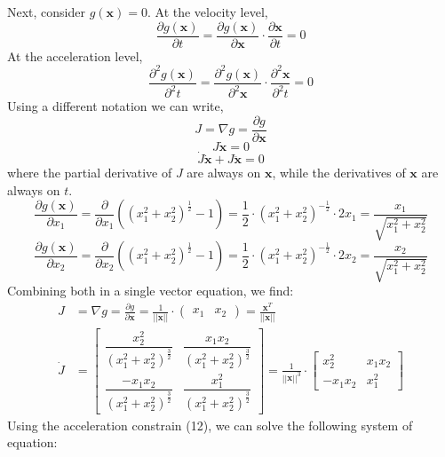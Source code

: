 \documentclass{article}
\begin{document}
Next, consider $g(\mathbf{x}) = 0$. At the velocity level,
\[
\frac{\partial{g(\mathbf{x})}}{\partial{t}}  = \frac{\partial{g(\mathbf{x})}}{\partial{\mathbf{x}}} \cdot \frac{\partial{\mathbf{x}}}{\partial{t}} = 0
\]
At the acceleration level,
\[
\frac{\partial^2{g(\mathbf{x})}}{\partial^2 t}  = \frac{\partial^2{g(\mathbf{x})}}{\partial^2{\mathbf{x}}} \cdot \frac{\partial^2{\mathbf{x}}}{\partial^2{t}} = 0
\]
Using a different notation we can write,
\begin{equation}
J = \nabla g = \frac{\partial{g}}{\partial{\mathbf{x}}}
\end{equation}
\begin{equation}
J \dot{\mathbf{x}} = 0
\end{equation}
\begin{equation}
\dot{J} \dot{\mathbf{x}} + J \ddot{\mathbf{x}} = 0
\end{equation}
where the partial derivative of $J$ are always on $\mathbf{x}$, while the derivatives of $\mathbf{x}$ are always on $t$.
\[    \frac{\partial g(\mathbf{x})}{\partial x_1} = \frac{\partial}{\partial x_1}((x_1^2+x_2^2)^{\frac{1}{2}} - 1)  = \frac{1}{2} \cdot (x_1^2 + x_2^2)^{-\frac{1}{2}} \cdot 2 x_1 = \frac{x_1}{\sqrt{x_1^2 + x_2^2}}
\]
\[
    \frac{\partial g(\mathbf{x})}{\partial x_2} = \frac{\partial}{\partial x_2}((x_1^2+x_2^2)^{\frac{1}{2}} - 1)  = \frac{1}{2} \cdot (x_1^2 + x_2^2)^{-\frac{1}{2}} \cdot 2 x_2 = \frac{x_2}{\sqrt{x_1^2 + x_2^2}}
\]
Combining both in a single vector equation, we find:
\begin{align*}
    J &= \nabla g = \frac{\partial{g}}{\partial{\mathbf{x}}} = 
    \frac{1}{||\mathbf{x}||} \cdot
    \begin{pmatrix}
        x_1 & x_2
    \end{pmatrix} =
    \frac{\mathbf{x}^T}{||\mathbf{x}||}\\
    \dot{J} &=
    \begin{bmatrix}
        \dfrac{x_2^2}{(x_1^2 + x_2^2)^{\frac{3}{2}}} & \dfrac{x_1 x_2}{(x_1^2 + x_2^2)^{\frac{3}{2}}} \\ 
        \dfrac{-x_1 x_2}{(x_1^2 + x_2^2)^{\frac{3}{2}}} & \dfrac{x_1^2}{(x_1^2 + x_2^2)^{\frac{3}{2}}}
    \end{bmatrix} = 
    \frac{1}{||\mathbf{x}||^3} \cdot
    \begin{bmatrix}
        x_2^2 & x_1 x_2 \\
        -x_1 x_2 & x_1^2
    \end{bmatrix}
\end{align*}
Using the acceleration constrain (12), we can solve the following system of equation:
\end{document}
